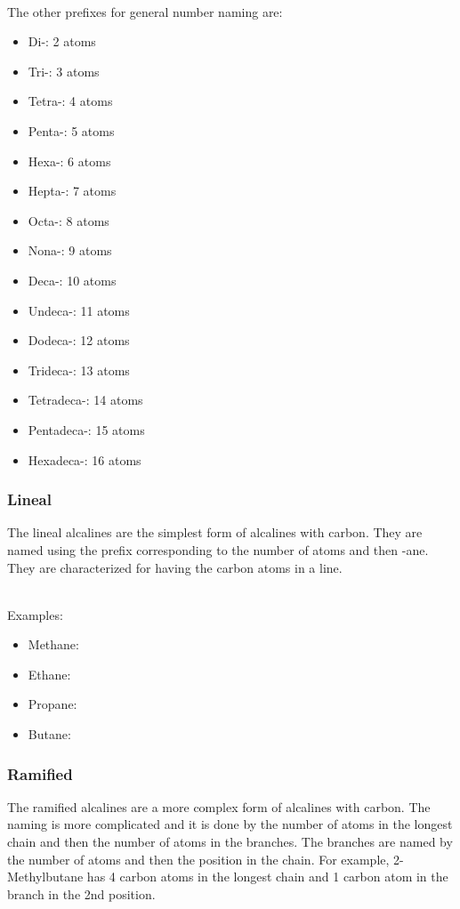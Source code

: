 \,\\
The other prefixes for general number naming are:
\begin{itemize}
    \item Di-: 2 atoms
    \item Tri-: 3 atoms
    \item Tetra-: 4 atoms
    \item Penta-: 5 atoms
    \item Hexa-: 6 atoms
    \item Hepta-: 7 atoms
    \item Octa-: 8 atoms
    \item Nona-: 9 atoms
    \item Deca-: 10 atoms
    \item Undeca-: 11 atoms
    \item Dodeca-: 12 atoms
    \item Trideca-: 13 atoms
    \item Tetradeca-: 14 atoms
    \item Pentadeca-: 15 atoms
    \item Hexadeca-: 16 atoms
\end{itemize}
\subsubsection{Lineal}
The lineal alcalines are the simplest form of alcalines with carbon. They are named using the prefix corresponding to the number of atoms and then -ane. They are characterized for having the carbon atoms in a line.

\,\\
Examples:
\begin{itemize}
    \item Methane: 
    \item Ethane: 
    \item Propane: 
    \item Butane: 
\end{itemize}
\subsubsection{Ramified}
The ramified alcalines are a more complex form of alcalines with carbon. The naming is more complicated and it is done by the number of atoms in the longest chain and then the number of atoms in the branches. The branches are named by the number of atoms and then the position in the chain. For example, 2-Methylbutane has 4 carbon atoms in the longest chain and 1 carbon atom in the branch in the 2nd position.

\begin{center}
\label{fig:2-Methylbutane}
\end{center}
